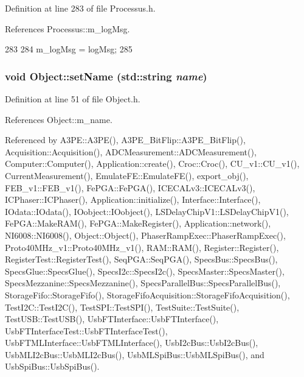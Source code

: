 Definition at line 283 of file Processus.h.

References Processus::m\_\-logMsg.


\begin{DoxyCode}
283                                     {
284     m_logMsg = logMsg;
285   }
\end{DoxyCode}
\hypertarget{classObject_ae30fea75683c2d149b6b6d17c09ecd0c}{
\subsubsection[{setName}]{\setlength{\rightskip}{0pt plus 5cm}void Object::setName (std::string {\em name})}}
\label{classObject_ae30fea75683c2d149b6b6d17c09ecd0c}


Definition at line 51 of file Object.h.

References Object::m\_\-name.

Referenced by A3PE::A3PE(), A3PE\_\-BitFlip::A3PE\_\-BitFlip(), Acquisition::Acquisition(), ADCMeasurement::ADCMeasurement(), Computer::Computer(), Application::create(), Croc::Croc(), CU\_\-v1::CU\_\-v1(), CurrentMeasurement(), EmulateFE::EmulateFE(), export\_\-obj(), FEB\_\-v1::FEB\_\-v1(), FePGA::FePGA(), ICECALv3::ICECALv3(), ICPhaser::ICPhaser(), Application::initialize(), Interface::Interface(), IOdata::IOdata(), IOobject::IOobject(), LSDelayChipV1::LSDelayChipV1(), FePGA::MakeRAM(), FePGA::MakeRegister(), Application::network(), NI6008::NI6008(), Object::Object(), PhaserRampExec::PhaserRampExec(), Proto40MHz\_\-v1::Proto40MHz\_\-v1(), RAM::RAM(), Register::Register(), RegisterTest::RegisterTest(), SeqPGA::SeqPGA(), SpecsBus::SpecsBus(), SpecsGlue::SpecsGlue(), SpecsI2c::SpecsI2c(), SpecsMaster::SpecsMaster(), SpecsMezzanine::SpecsMezzanine(), SpecsParallelBus::SpecsParallelBus(), StorageFifo::StorageFifo(), StorageFifoAcquisition::StorageFifoAcquisition(), TestI2C::TestI2C(), TestSPI::TestSPI(), TestSuite::TestSuite(), TestUSB::TestUSB(), UsbFTInterface::UsbFTInterface(), UsbFTInterfaceTest::UsbFTInterfaceTest(), UsbFTMLInterface::UsbFTMLInterface(), UsbI2cBus::UsbI2cBus(), UsbMLI2cBus::UsbMLI2cBus(), UsbMLSpiBus::UsbMLSpiBus(), and UsbSpiBus::UsbSpiBus().


